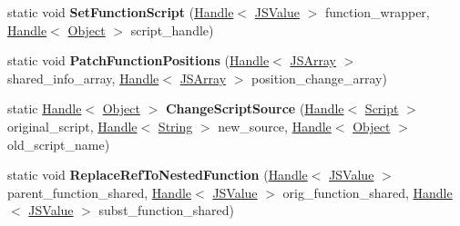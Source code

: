 \begin{DoxyCompactItemize}
\item 
static void {\bfseries Set\+Function\+Script} (\hyperlink{classv8_1_1internal_1_1_handle}{Handle}$<$ \hyperlink{classv8_1_1internal_1_1_j_s_value}{J\+S\+Value} $>$ function\+\_\+wrapper, \hyperlink{classv8_1_1internal_1_1_handle}{Handle}$<$ \hyperlink{classv8_1_1internal_1_1_object}{Object} $>$ script\+\_\+handle)\hypertarget{classv8_1_1internal_1_1_live_edit_ae077e76eb5240169ce4a0335840e16b5}{}\label{classv8_1_1internal_1_1_live_edit_ae077e76eb5240169ce4a0335840e16b5}

\item 
static void {\bfseries Patch\+Function\+Positions} (\hyperlink{classv8_1_1internal_1_1_handle}{Handle}$<$ \hyperlink{classv8_1_1internal_1_1_j_s_array}{J\+S\+Array} $>$ shared\+\_\+info\+\_\+array, \hyperlink{classv8_1_1internal_1_1_handle}{Handle}$<$ \hyperlink{classv8_1_1internal_1_1_j_s_array}{J\+S\+Array} $>$ position\+\_\+change\+\_\+array)\hypertarget{classv8_1_1internal_1_1_live_edit_aadfd0c8a3d53b1e7214ae59052da38e1}{}\label{classv8_1_1internal_1_1_live_edit_aadfd0c8a3d53b1e7214ae59052da38e1}

\item 
static \hyperlink{classv8_1_1internal_1_1_handle}{Handle}$<$ \hyperlink{classv8_1_1internal_1_1_object}{Object} $>$ {\bfseries Change\+Script\+Source} (\hyperlink{classv8_1_1internal_1_1_handle}{Handle}$<$ \hyperlink{classv8_1_1internal_1_1_script}{Script} $>$ original\+\_\+script, \hyperlink{classv8_1_1internal_1_1_handle}{Handle}$<$ \hyperlink{classv8_1_1internal_1_1_string}{String} $>$ new\+\_\+source, \hyperlink{classv8_1_1internal_1_1_handle}{Handle}$<$ \hyperlink{classv8_1_1internal_1_1_object}{Object} $>$ old\+\_\+script\+\_\+name)\hypertarget{classv8_1_1internal_1_1_live_edit_a9a05d33b4381be75f36ddbc1944d108b}{}\label{classv8_1_1internal_1_1_live_edit_a9a05d33b4381be75f36ddbc1944d108b}

\item 
static void {\bfseries Replace\+Ref\+To\+Nested\+Function} (\hyperlink{classv8_1_1internal_1_1_handle}{Handle}$<$ \hyperlink{classv8_1_1internal_1_1_j_s_value}{J\+S\+Value} $>$ parent\+\_\+function\+\_\+shared, \hyperlink{classv8_1_1internal_1_1_handle}{Handle}$<$ \hyperlink{classv8_1_1internal_1_1_j_s_value}{J\+S\+Value} $>$ orig\+\_\+function\+\_\+shared, \hyperlink{classv8_1_1internal_1_1_handle}{Handle}$<$ \hyperlink{classv8_1_1internal_1_1_j_s_value}{J\+S\+Value} $>$ subst\+\_\+function\+\_\+shared)\hypertarget{classv8_1_1internal_1_1_live_edit_a5f745ed37ef70144f3bbe2c7fbca71a7}{}\label{classv8_1_1internal_1_1_live_edit_a5f745ed37ef70144f3bbe2c7fbca71a7}


\end{DoxyCompactItemize}

